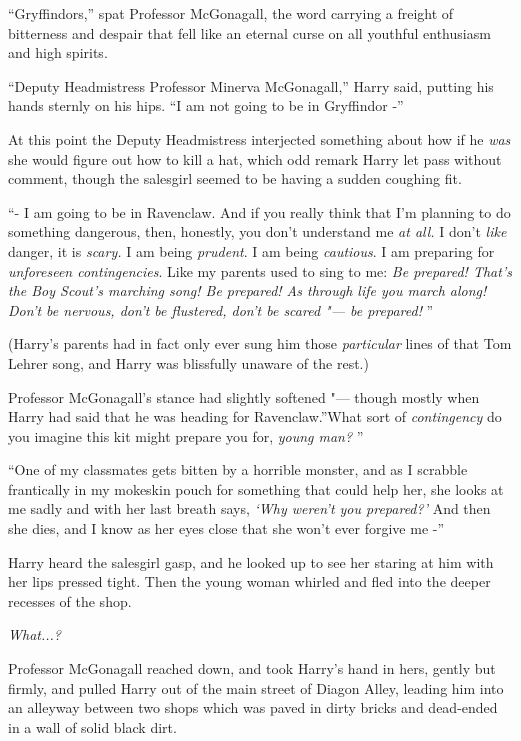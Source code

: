 ``Gryffindors,'' spat Professor McGonagall, the word carrying a freight
of bitterness and despair that fell like an eternal curse on all
youthful enthusiasm and high spirits.

``Deputy Headmistress Professor Minerva McGonagall,'' Harry said,
putting his hands sternly on his hips. ``I am not going to be in
Gryffindor -''

At this point the Deputy Headmistress interjected something about how if
he \emph{was} she would figure out how to kill a hat, which odd remark
Harry let pass without comment, though the salesgirl seemed to be having
a sudden coughing fit.

``- I am going to be in Ravenclaw. And if you really think that I'm
planning to do something dangerous, then, honestly, you don't understand
me \emph{at all.} I don't \emph{like} danger, it is \emph{scary.} I am
being \emph{prudent}. I am being \emph{cautious}. I am preparing for
\emph{unforeseen contingencies}. Like my parents used to sing to me:
\emph{Be prepared! That's the Boy Scout's marching song! Be prepared! As
through life you march along! Don't be nervous, don't be flustered,
don't be scared "--- be prepared!} ''

(Harry's parents had in fact only ever sung him those \emph{particular}
lines of that Tom Lehrer song, and Harry was blissfully unaware of the
rest.)

Professor McGonagall's stance had slightly softened "--- though mostly when
Harry had said that he was heading for Ravenclaw.''What sort of
\emph{contingency} do you imagine this kit might prepare you for,
\emph{young man?} ''

``One of my classmates gets bitten by a horrible monster, and as I
scrabble frantically in my mokeskin pouch for something that could help
her, she looks at me sadly and with her last breath says, \emph{`Why
weren't you prepared?'} And then she dies, and I know as her eyes close
that she won't ever forgive me -''

Harry heard the salesgirl gasp, and he looked up to see her staring at
him with her lips pressed tight. Then the young woman whirled and fled
into the deeper recesses of the shop.

\emph{What...?}

Professor McGonagall reached down, and took Harry's hand in hers, gently
but firmly, and pulled Harry out of the main street of Diagon Alley,
leading him into an alleyway between two shops which was paved in dirty
bricks and dead-ended in a wall of solid black dirt.

